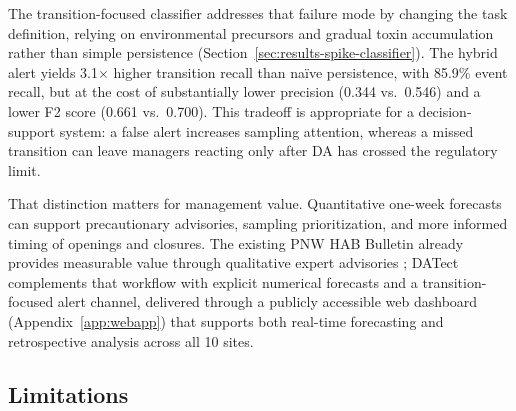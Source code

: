 \documentclass[toxins,article,submit,moreauthors]{Definitions/mdpi}
\begin{document}
The transition-focused classifier addresses that failure mode by changing the task definition, relying on environmental precursors and gradual toxin accumulation rather than simple persistence (Section~\ref{sec:results-spike-classifier}). The hybrid alert yields 3.1$\times$ higher transition recall than na\"ive persistence, with 85.9\% event recall, but at the cost of substantially lower precision (0.344 vs.\ 0.546) and a lower F2 score (0.661 vs.\ 0.700). This tradeoff is appropriate for a decision-support system: a false alert increases sampling attention, whereas a missed transition can leave managers reacting only after DA has crossed the regulatory limit.

That distinction matters for management value. Quantitative one-week forecasts can support precautionary advisories, sampling prioritization, and more informed timing of openings and closures. The existing PNW HAB Bulletin already provides measurable value through qualitative expert advisories \cite{Jin2024}; DATect complements that workflow with explicit numerical forecasts and a transition-focused alert channel, delivered through a publicly accessible web dashboard (Appendix~\ref{app:webapp}) that supports both real-time forecasting and retrospective analysis across all 10 sites.

\subsection{Limitations}
\label{sec:discussion-limitations}
\end{document}
